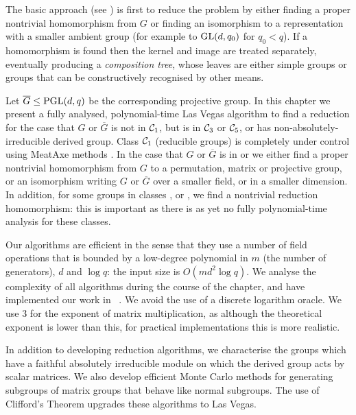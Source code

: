 The basic approach (see \cite{MatGrpProj, AkosMaxISSAC}) 
is first to reduce 
the problem by either finding a proper nontrivial homomorphism 
from $G$ or finding an isomorphism to a representation 
with a smaller ambient group (for example to $\GL(d, q_0)$ 
for  $q_0 < q$).  
If a homomorphism is found then the kernel and image are treated
separately, eventually producing a
\emph{composition tree}, whose leaves are either simple groups or
groups that can be constructively  recognised by other means.

 Let 
$\overline{G} \leq \PGL(d, q)$ be the corresponding projective group. 
In this chapter we present a fully analysed, polynomial-time Las
Vegas algorithm to find a reduction for the case that  $G$ or $\overline{G}$
 is not in $\mathcal{C}_{1}$, but is in $\mathcal{C}_{3}$ or $\mathcal{C}_{5}$, 
or has non-absolutely-irreducible derived group. 
Class $\mathcal{C}_{1}$ (reducible groups)
 is completely under control using MeatAxe methods
\cite{MeatAxeHoltRees, IL, MeatAxeRP}.
In the case that $G$ or $\overline{G}$ is in  or  
we either find a proper nontrivial homomorphism from $G$ to a permutation, matrix or projective group, or an isomorphism writing $G$ or $\overline{G}$ over a smaller field, or in a smaller dimension. 
  In addition, for some groups in classes ,  or ,
 we find a nontrivial reduction homomorphism: 
this is important as there is as yet no fully 
polynomial-time analysis for these classes. 

Our algorithms are efficient in the sense that they use a 
number of field operations that is bounded by a low-degree polynomial 
in $m$ (the number of generators), $d$ and $\log q$: 
the input size is  $O(m d^2 \log q)$. We analyse 
the complexity of all algorithms during the course 
of the chapter, and have implemented our work in \GAP\ \cite{GAP4}. 
We avoid the use of a discrete logarithm oracle. We use $3$ for
 the exponent of matrix multiplication, as although the theoretical 
exponent is lower than this, for practical implementations this is 
more realistic. 

In addition to developing reduction algorithms, we characterise 
the groups which have a faithful absolutely irreducible module
on which the derived group acts by scalar matrices. 
We also develop efficient Monte Carlo 
methods for generating subgroups of matrix groups that behave 
like normal subgroups. The use of Clifford's Theorem 
upgrades these algorithms to Las Vegas. 

